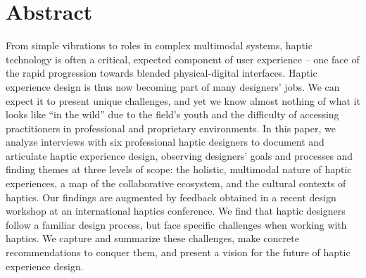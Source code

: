 \section{Abstract}
From simple vibrations to roles in complex multimodal systems, haptic technology is often a critical, expected component of user experience -- one face of the rapid progression towards blended physical-digital interfaces.
Haptic experience design is thus now becoming part of many designers' jobs. We can expect it to present unique challenges, and yet we know almost nothing of what it looks like ``in the wild''
due to the field's youth and the difficulty of accessing practitioners %
in professional and proprietary environments.
In this paper, we analyze interviews with six professional haptic designers to document and articulate haptic experience design, observing designers' goals and processes and finding themes at three levels of scope: the holistic, multimodal nature of haptic experiences, a map of the collaborative ecosystem, and the cultural contexts of haptics.
%
Our findings are 
augmented by %
feedback obtained in a recent design workshop at an international haptics conference.
We find %
that haptic designers follow a familiar design process, but face specific challenges when working with haptics. 
We capture and summarize these challenges, make concrete recommendations to conquer them, and present a vision for the future of haptic experience design.


